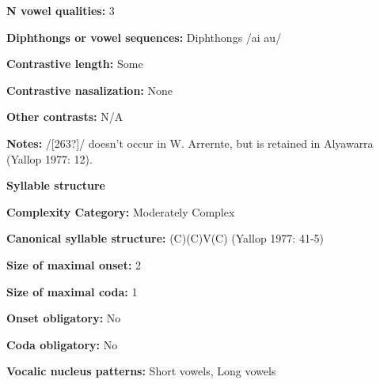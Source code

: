 \begin{styleBody}
\textbf{N vowel qualities:} 3
\end{styleBody}

\begin{styleBody}
\textbf{Diphthongs or vowel sequences:} Diphthongs /ai au/
\end{styleBody}

\begin{styleBody}
\textbf{Contrastive length:} Some
\end{styleBody}

\begin{styleBody}
\textbf{Contrastive nasalization:} None
\end{styleBody}

\begin{styleBody}
\textbf{Other contrasts:} N/A
\end{styleBody}

\begin{styleBody}
\textbf{Notes:} /[263?]/ doesn’t occur in W. Arrernte, but is retained in Alyawarra (Yallop 1977: 12).
\end{styleBody}

\begin{styleBody}
\textbf{Syllable structure}
\end{styleBody}

\begin{styleBody}
\textbf{Complexity Category: }Moderately Complex
\end{styleBody}

\begin{styleBody}
\textbf{Canonical syllable structure:} (C)(C)V(C)\textbf{ }(Yallop 1977: 41-5)
\end{styleBody}

\begin{styleBody}
\textbf{Size of maximal onset:} 2
\end{styleBody}

\begin{styleBody}
\textbf{Size of maximal coda:} 1
\end{styleBody}

\begin{styleBody}
\textbf{Onset obligatory:} No
\end{styleBody}

\begin{styleBody}
\textbf{Coda obligatory:} No
\end{styleBody}

\begin{styleBody}
\textbf{Vocalic nucleus patterns:} Short vowels, Long vowels
\end{styleBody}

